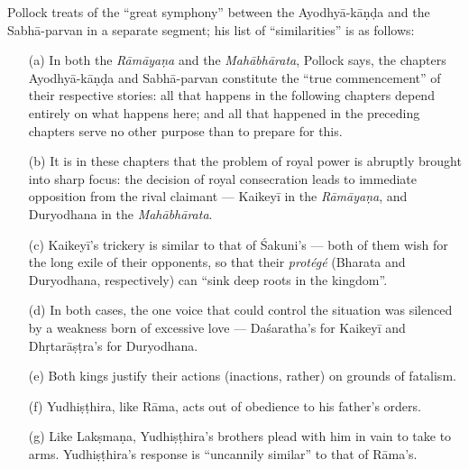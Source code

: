 Pollock treats of the “great symphony” between the Ayodhyā-kāṇḍa and the Sabhā-parvan in a separate segment; his list of “similarities” is as follows: 
\begin{itemize}
\item[(a)] In both the {\sl Rāmāyaṇa} and the {\sl Mahābhārata}, Pollock says, the chapters Ayodhyā-kāṇḍa and Sabhā-parvan constitute the “true commencement” of their respective stories: all that happens in the following chapters depend entirely on what happens here; and all that happened in the preceding chapters serve no other purpose than to prepare for this.

\item[(b)] It is in these chapters that the problem of royal power is abruptly brought into sharp focus: the decision of royal consecration leads to immediate opposition from the rival claimant --- Kaikeyī in the {\sl Rāmāyaṇa}, and Duryodhana in the {\sl Mahābhārata}. 

\item[(c)] Kaikeyī’s trickery is similar to that of Śakuni’s --- both of them wish for the long exile of their opponents, so that their {\sl protégé} (Bharata and Duryodhana, respectively) can “sink deep roots in the kingdom”. 

\item[(d)] In both cases, the one voice that could control the situation was silenced by a weakness born of excessive love --- Daśaratha’s for Kaikeyī and Dhṛtarāṣṭra’s for Duryodhana.  

\item[(e)] Both kings justify their actions (inactions, rather) on grounds of fatalism.

\item[(f)] Yudhiṣṭhira, like Rāma, acts out of obedience to his father’s orders. 

\item[(g)] Like Lakṣmaṇa, Yudhiṣṭhira’s brothers plead with him in vain to take to arms. Yudhiṣṭhira’s response is “uncannily similar” to that of Rāma’s.  
\end{itemize}

